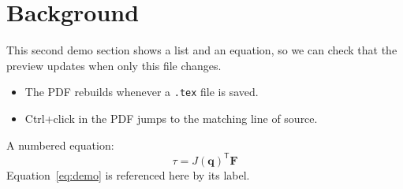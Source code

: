 \section{Background}

This second demo section shows a list and an equation, so we can check that the preview
updates when only this file changes.

\begin{itemize}
  \item The PDF rebuilds whenever a \texttt{.tex} file is saved.
  \item Ctrl+click in the PDF jumps to the matching line of source.
\end{itemize}

A numbered equation:
\begin{equation}
  \tau = J(\mathbf{q})^{\mathsf{T}} \mathbf{F}
  \label{eq:demo}
\end{equation}
Equation~\eqref{eq:demo} is referenced here by its label.
